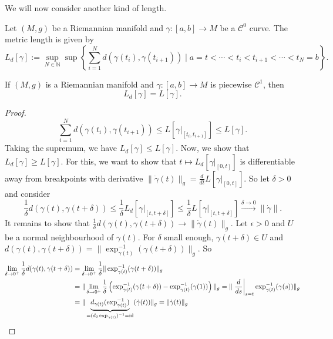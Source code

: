 We will now consider another kind of length.
\begin{definition}
    Let $(M,g)$ be a Riemannian manifold and $\gamma: [a,b] \to M$ be a $\mathcal{C}^0$ curve. The metric length is given by \[
        L_d[\gamma]:=\sup_{N \in \mathbb{N}} \sup \left\{ \sum_{i=1}^N d(\gamma(t_i), \gamma(t_{i+1})) \mid a=t < \cdots < t_i <t_{i+1} < \cdots < t_N=b\right\}.
    \]  
\end{definition}
\begin{theorem}
    If $(M,g)$ is a Riemannian manifold and $\gamma: [a,b] \to M$ is piecewise $\mathcal{C}^1$, then \[
        L_d[\gamma]=L[\gamma]
    .\] 
\end{theorem}
\begin{proof}
    \[
        \sum_{i=1}^N d(\gamma(t_i),\gamma(t_{i+1})) \leq L[\gamma|_{[t_i,t_{i+1}]}] \leq L[\gamma]
    .\]  Taking the supremum, we have $L_d[\gamma]\leq L[\gamma]$. Now, we show that $L_d[\gamma]\geq L[\gamma]$. For this, we want to show that $t \mapsto L_d[\gamma|_{[0,t]}]$ is differentiable away from breakpoints with derivative $\|\dot{\gamma}(t)\|_g = \frac{d}{dt} L[\gamma|_{[0,t]}]$. So let $\delta > 0$ and consider \[
    \frac{1}{\delta} d(\gamma(t),\gamma(t+\delta)) \leq \frac{1}{\delta} L_d[\gamma|_{[t,t+\delta]}] \leq \frac{1}{\delta} L[\gamma|_{[t,t+\delta]}] \overset{\delta \to 0}\longrightarrow \|\dot{\gamma}\|
.\] It remains to show that $\frac{1}{\delta} d(\gamma(t),\gamma(t+\delta)) \to \|\dot{\gamma}(t)\|_g$. Let $\epsilon > 0$ and $U$ be a normal neighbourhood of $\gamma(t)$. For $\delta$ small enough, $\gamma(t+\delta)\in U$ and $d(\gamma(t),\gamma(t+\delta)) = \|\exp^{-1}_{\gamma(t)}(\gamma(t+\delta)) \|_g$. So
\begin{align*}
    \lim_{\delta \to 0^+} \frac{1}{\delta} d(\gamma(t),\gamma(t+\delta)) &= \lim_{\delta \to 0^+} \frac{1}{\delta} \| \exp^{-1}_{\gamma(t)}(\gamma(t+\delta))\|_g\\
                                                                         &= \| \lim_{\delta \to 0^+} \frac{1}{\delta} \left( \exp^{-1}_{\gamma(t)} (\gamma(t + \delta))-\exp^{-1}_{\gamma(t)}(\gamma(1))\right) \|_g = \| \left.\frac{d}{ds}\right|_{s=t} \exp^{-1}_{\gamma(t)}(\gamma(s)) \|_g \\
                                                                         &= \| \underbrace{d_{\gamma(t)}(\exp^{-1}_{\gamma(t)})}_{=(d_0\exp_{\gamma(t)})^{-1}=\operatorname{id}}(\dot{\gamma}(t))\|_g = \|\dot{\gamma}(t)\|_g 
\end{align*}
\end{proof}
